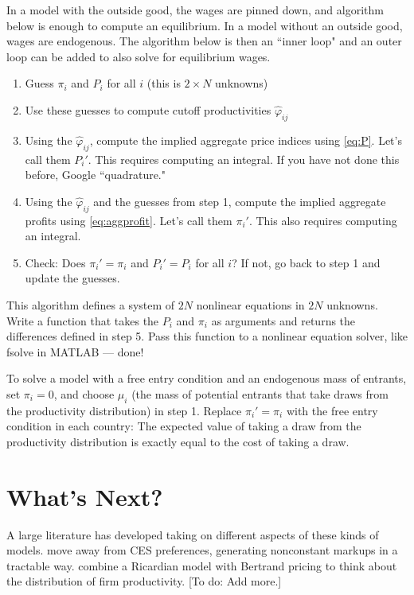 \documentclass[11pt, pdftex]{article}
\begin{document}
In a model with the outside good, the wages are pinned down, and algorithm below is enough to compute an equilibrium.  In a model without an outside good, wages are endogenous.  The algorithm below is then an ``inner loop" and an outer loop can be added to also solve for equilibrium wages.
\begin{enumerate}
    \item Guess $\pi_{i}$ and $P_i$ for all $i$ (this is $2\times N$ unknowns)
    \item Use these guesses to compute cutoff productivities $\hat{\varphi}_{ij}$

    \item Using the $\hat{\varphi}_{ij}$, compute the implied aggregate price indices using \eqref{eq:P}. Let's call them $P_i'$.  This requires computing an integral.  If you have not done this before, Google ``quadrature."

    \item Using the $\hat{\varphi}_{ij}$ and the guesses from step 1, compute the implied aggregate profits using \eqref{eq:aggprofit}. Let's call them $\pi_i'$.  This also requires computing an integral.

    \item Check: Does $\pi_i'=\pi_i$ and $P_i'=P_i$ for all $i$?  If not, go back to step 1 and update the guesses.
\end{enumerate}

This algorithm defines a system of $2N$ nonlinear equations in $2N$ unknowns. Write a function that takes the $P_i$ and $\pi_i$ as arguments and returns the differences defined in step 5.  Pass this function to a nonlinear equation solver, like fsolve in MATLAB --- done!

To solve a model with a free entry condition and an endogenous mass of entrants, set $\pi_i=0$, and choose $\mu_i$ (the mass of potential entrants that take draws from the productivity distribution) in step 1.  Replace $\pi_i'=\pi_i$ with the free entry condition in each country: The expected value of taking a draw from the productivity distribution is exactly equal to the cost of taking a draw.

\section{What's Next?}
A large literature has developed taking on different aspects of these kinds of models.  \citet{melitzOttaviano} move away from CES preferences, generating nonconstant markups in a tractable way.  \citet{bernardEaton} combine a Ricardian model with  Bertrand pricing to think about the distribution of firm productivity.  [To do: Add more.]

\setlength{\parskip}{0.0cm}
\printbibliography
\end{document}
